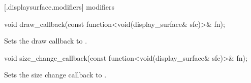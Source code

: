  [\iotwod.displaysurface.modifiers]{ modifiers}

%
\begin{itemdecl}
void draw_callback(const function<void(display_surface& sfc)>& fn);
\end{itemdecl}
\begin{itemdescr}
\pnum
\effects
Sets the draw callback to .
\end{itemdescr}

%
\begin{itemdecl}
void size_change_callback(const function<void(display_surface& sfc)>& fn);
\end{itemdecl}
\begin{itemdescr}
\pnum
\effects
Sets the size change callback to .
\end{itemdescr}

